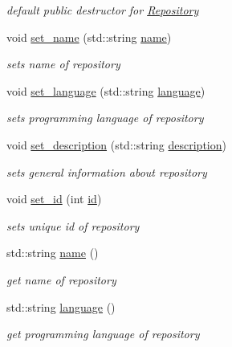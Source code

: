 \begin{DoxyCompactItemize}
\begin{DoxyCompactList}\small\item\em default public destructor for \hyperlink{classRepository}{Repository} \end{DoxyCompactList}\item 
void \hyperlink{classRepository_a41e85c3ea1a98682066fca0d9386dd72}{set\+\_\+name} (std\+::string \hyperlink{classRepository_a8d967c3615e5a68be145889fb23aac14}{name})
\begin{DoxyCompactList}\small\item\em sets name of repository \end{DoxyCompactList}\item 
void \hyperlink{classRepository_a42c5546e4289a197a5dc5b57e3b20c73}{set\+\_\+language} (std\+::string \hyperlink{classRepository_adffe93ad41af4c08c3adb8bcb1ea12fa}{language})
\begin{DoxyCompactList}\small\item\em sets programming language of repository \end{DoxyCompactList}\item 
void \hyperlink{classRepository_a6db26d595479cb9bad8f77c71cace7f0}{set\+\_\+description} (std\+::string \hyperlink{classRepository_a81933778a20e63810589ebc9de593782}{description})
\begin{DoxyCompactList}\small\item\em sets general information about repository \end{DoxyCompactList}\item 
void \hyperlink{classRepository_a55158dd3fae6d0baaff29557c4a853b4}{set\+\_\+id} (int \hyperlink{classRepository_a939747771b843e2e6ac651bdf273ec0f}{id})
\begin{DoxyCompactList}\small\item\em sets unique id of repository \end{DoxyCompactList}\item 
std\+::string \hyperlink{classRepository_a8d967c3615e5a68be145889fb23aac14}{name} ()
\begin{DoxyCompactList}\small\item\em get name of repository \end{DoxyCompactList}\item 
std\+::string \hyperlink{classRepository_adffe93ad41af4c08c3adb8bcb1ea12fa}{language} ()
\begin{DoxyCompactList}\small\item\em get programming language of repository \end{DoxyCompactList}\item 

\end{DoxyCompactItemize}
